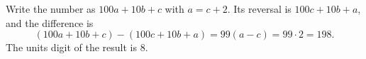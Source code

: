 Write the number as $100a+10b+c$ with $a=c+2$. Its reversal is $100c+10b+a$, and the difference is
\[(100a+10b+c)-(100c+10b+a)=99(a-c)=99\cdot2=198.\]
The units digit of the result is $\boxed{8}$.
